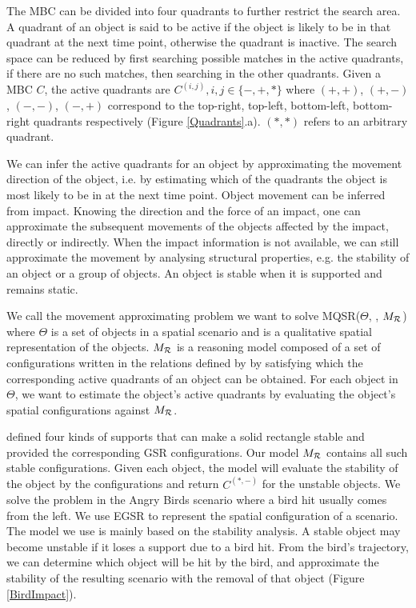 \documentclass[letterpaper]{article}
\begin{document}
The MBC can be divided into four quadrants to further restrict the search area. A quadrant of an object is said to be active if the object is likely to be in that quadrant at the next time point, otherwise the quadrant is inactive. The search space can be reduced by first searching possible matches in the active quadrants, if there are no such matches, then searching in the other quadrants. Given a MBC $C$, the active quadrants are $C^{(i,j)}, i,j \in \{-, +, *\}$ where $(+,+)$, $(+,-)$, $(-,-)$, $(-,+)$ correspond to the top-right, top-left, bottom-left, bottom-right quadrants respectively (Figure \ref{Quadrants}.a). $(*, *)$ refers to an arbitrary quadrant. 

We can infer the active quadrants for an object by approximating the movement direction of the object, i.e. by estimating which of the quadrants the object is most likely to be in at the next time point. Object movement can be inferred from impact. Knowing the direction and the force of an impact, one can approximate the subsequent movements of the objects affected by the impact, directly or indirectly. When the impact information is not available, we can still approximate the movement by analysing structural properties, e.g. the stability of an object or a group of objects. An object is stable when it is supported and remains static. %

We call the movement approximating problem we want to solve MQSR($\Theta$, , $M_{\cal{R}}$) where $\Theta$ is a set of objects in a spatial scenario and  is a qualitative spatial representation of the objects. $M_{\cal{R}}$ is a reasoning model composed of a set of configurations written in the relations defined by  by satisfying which the corresponding active quadrants of an object can be obtained. For each object in $\Theta$, we want to estimate the object's active quadrants by evaluating the object's spatial configurations against $M_{\cal{R}}$.

\cite{Ge2013} defined four kinds of supports that can make a solid rectangle stable and provided the corresponding GSR configurations. Our model $M_{\cal R}$ contains all such stable configurations. Given each object, the model will evaluate the stability of the object by the configurations and return $C^{(*,-)}$ for the unstable objects. We solve the problem in the Angry Birds scenario where a bird hit usually comes from the left. We use EGSR to represent the spatial configuration of a scenario. The model we use is mainly based on the stability analysis. A stable object may become unstable if it loses a support due to a bird hit. From the bird's trajectory, we can determine which object will be hit by the bird, and approximate the stability of the resulting scenario with the removal of that object (Figure \ref{BirdImpact}). 
\end{document}
